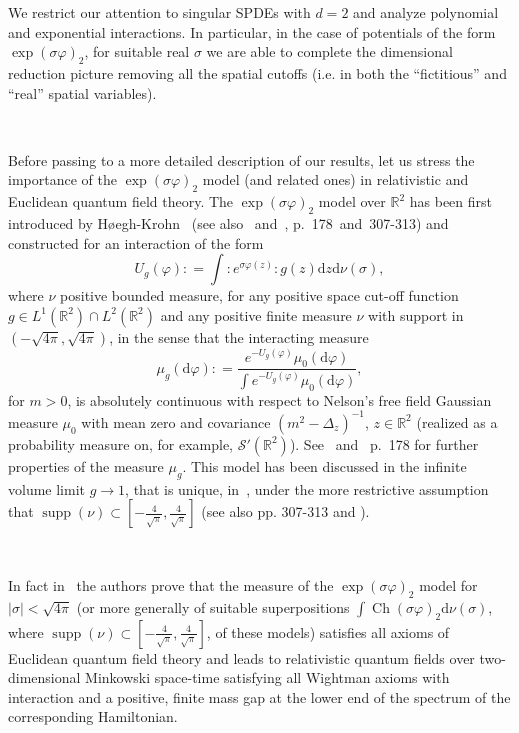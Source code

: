 \documentclass[a4paper,10pt]{article}
\newcommand{\mathd}{\mathrm{d}}
\newcommand{\tmop}[1]{\ensuremath{\operatorname{#1}}}
\begin{document}
We restrict our attention to singular SPDEs with $d = 2$ and analyze
polynomial and exponential interactions. In particular, in the case of
potentials of the form $\exp (\sigma \varphi)_2$, for suitable real $\sigma$
we are able to complete the dimensional reduction picture removing all the
spatial cutoffs (i.e. in both the ``fictitious'' and ``real'' spatial
variables).

\

Before passing to a more detailed description of our results, let us stress
the importance of the $\exp (\sigma \varphi)_2$ model (and related ones) in
relativistic and Euclidean quantum field theory. The $\exp (\sigma \varphi)_2$
model over $\mathbb{R}^2$ has been first introduced by
H{\o}egh-Krohn~{\cite{Krohn1971}} (see also~{\cite{Krohn1974}}
and~{\cite{Simon1974}}, p.~178~and~307-313) and constructed for an interaction
of the form
\[ U_g (\varphi) : = \int : e^{\sigma \varphi (z)} : g (z) \mathd z \mathd \nu
   (\sigma), \]
   where $\nu$ positive bounded measure, for any positive space cut-off function $g \in L^1 (\mathbb{R}^2) \cap L^2
(\mathbb{R}^2)$ and any positive finite measure $\nu$ with support in $(-
\sqrt{4 \pi}, \sqrt{4 \pi})$, in the sense that the interacting measure
\[ \mu_g (\mathd \varphi) : = \frac{e^{- U_g (\varphi)} \mu_0 (\mathd
   \varphi)}{\int e^{- U_g (\varphi)} \mu_0 (\mathd \varphi)}, \]
for $m > 0$, is absolutely continuous with respect to Nelson's free field
Gaussian measure $\mu_0$ with mean zero and covariance $(m^2 - \Delta_z)^{-
1}$, $z \in \mathbb{R}^2$ (realized as a probability measure on, for example,
$\mathcal{S}' (\mathbb{R}^2)$). See~{\cite{Krohn1974,Krohn1971}}
and~{\cite{Simon1974}} p.~178 for further properties of the measure $\mu_g$.
This model has been discussed in the infinite volume limit $g \rightarrow 1$,
that is unique, in~{\cite{Krohn1974}}, under the more restrictive assumption
that $\tmop{supp} (\nu) \subset \left[ - \frac{4}{\sqrt{\pi}},
\frac{4}{\sqrt{\pi}} \right]$ (see also {\cite{Simon1974}} pp. 307-313 and
{\cite{FroPa}}).

\

In fact in~{\cite{Krohn1974}} the authors prove that the measure of the $\exp
(\sigma \varphi)_2$ model for $| \sigma | < \sqrt{4 \pi}$ (or more generally
of suitable superpositions $\int \tmop{Ch} (\sigma \varphi)_2 \mathd \nu
(\sigma)$, where $\tmop{supp} (\nu) \subset \left[ - \frac{4}{\sqrt{\pi}},
\frac{4}{\sqrt{\pi}} \right]$, of these models) satisfies all axioms of
Euclidean quantum field theory and leads to relativistic quantum fields over
two-dimensional Minkowski space-time satisfying all Wightman axioms with
interaction and a positive, finite mass gap at the lower end of the spectrum
of the corresponding Hamiltonian.
\end{document}
